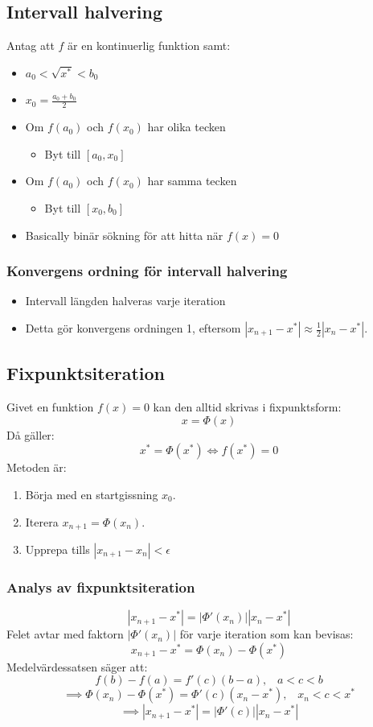 \documentclass[a4paper,11pt]{article}
\begin{document}
\subsection{Intervall halvering}
Antag att $f$ är en kontinuerlig funktion samt:
\begin{itemize}
    \item $a_0 < \sqrt{x^*} < b_0$
    \item $x_0 = \frac{a_0 + b_0}{2}$
    \item Om $f(a_0)$ och $f(x_0)$ har olika tecken 
    \begin{itemize}
        \item Byt till $[a_0, x_0]$
    \end{itemize}
    \item Om $f(a_0)$ och $f(x_0)$ har samma tecken
    \begin{itemize}
        \item Byt till $[x_0, b_0]$
    \end{itemize}
    \item Basically binär sökning för att hitta när $f(x) = 0$
\end{itemize}

\subsubsection{Konvergens ordning för intervall halvering}
\begin{itemize}
    \item Intervall längden halveras varje iteration
    \item Detta gör konvergens ordningen 1, eftersom $|x_{n+1} - x^*| \approx \frac{1}{2} |x_n - x^*|$.
\end{itemize}

\subsection{Fixpunktsiteration}
Givet en funktion $f(x) = 0$ kan den alltid skrivas i fixpunktsform:
\[
x = \Phi(x)
\]
Då gäller:
$$x^* = \Phi(x^*) \iff f(x^*) = 0$$
Metoden är:
\begin{enumerate}
    \item Börja med en startgissning $x_0$.
    \item Iterera $x_{n+1} = \Phi(x_n)$.
    \item Upprepa tills $|x_{n+1} - x_n| < \epsilon$
\end{enumerate}

\subsubsection{Analys av fixpunktsiteration}
$$|x_{n+1} - x^*| = |\Phi'(x_n)||x_n - x^*|$$
Felet avtar med faktorn $|\Phi'(x_n)|$ för varje iteration som kan bevisas:
$$x_{n+1} - x^* = \Phi(x_n) - \Phi(x^*)$$
Medelvärdessatsen säger att:
$$f(b) - f(a) = f'(c)(b-a), \hspace{10pt} a < c < b$$
$$\implies \Phi(x_n) - \Phi(x^*) = \Phi'(c)(x_n - x^*), \hspace{10pt} x_n < c < x^*$$
$$\implies |x_{n+1} - x^*| = |\Phi'(c)||x_n - x^*|$$
\end{document}
